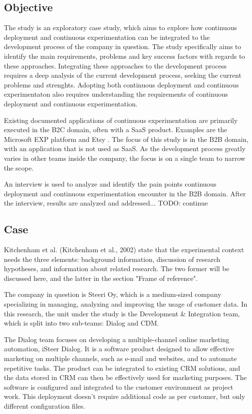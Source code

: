 \documentclass[english]{tktltiki2}
\theoremstyle{definition}
\theoremstyle{remark}
\begin{document}
\subsection{Objective} %

The study is an exploratory case study, which aims to explore how continuous deployment and continuous experimentation can be integrated to the development process of the company in question. The study specifically aims to identify the main requirements, problems and key success factors with regards to these approaches. Integrating these approaches to the development process requires a deep analysis of the current development process, seeking the current problems and strenghts. Adopting both continuous deployment and continuous experimentaton also requires understanding the requirements of continuous deployment and continuous experimentation. 

Existing documented applications of continuous experimentation are primarily executed in the B2C domain, often with a SaaS product. Examples are the Microsoft EXP platform \cite{ep} and Etsy \cite{}. The focus of this study is in the B2B domain, with an application that is not used as SaaS. As the development process greatly varies in other teams inside the company, the focus is on a single team to narrow the scope.

An interview is used to analyze and identify the pain points continuous deployment and continuous experimentation encounter in the B2B domain. After the interview, results are analyzed and addressed... TODO: continue

\subsection{Case} %
Kitchenham et al. (Kitchenham et al., 2002) state that the experimental context needs the three elements: background information, discussion of research hypotheses, and information about related research. The two former will be discussed here, and the latter in the section "Frame of reference".

The company in question is Steeri Oy, which is a medium-sized company specializing in managing, analyzing and improving the usage of customer data. In this research, the unit under the study is the Development & Integration team, which is split into two sub-teams: Dialog and CDM. 

The Dialog team focuses on developing a multiple-channel online marketing automation, iSteer Dialog. It is a software product designed to allow effective marketing on multiple channels, such as e-mail and websites, and to automate repetitive tasks. The product can be integrated to existing CRM solutions, and the data stored in CRM can then be effectively used for marketing purposes. The software is configured and integrated to the customer environment as project work. This deployment doesn't require additional code as per customer, but only different configuration files. 
\end{document}
